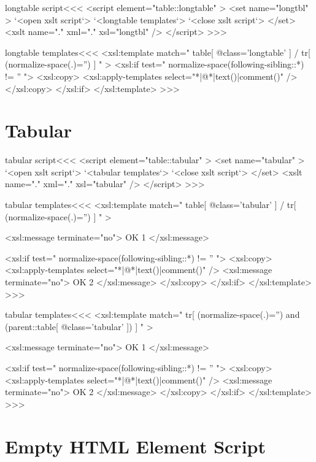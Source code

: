 \documentclass{article}
\begin{document}
{{{ 
\<longtable script\><<<
<script element="table::longtable" >
   <set name="longtbl" >
      `<open xslt script`>
      `<longtable templates`>
      `<close xslt script`>
   </set>
   <xslt name="." xml="." xsl="longtbl" />
</script> 
>>>


\<longtable templates\><<<
<xsl:template match=" table[ @class='longtable' ]
                    / tr[ (normalize-space(.)='') ] " >
   <xsl:if test=" normalize-space(following-sibling::*) != '' ">
      <xsl:copy>
         <xsl:apply-templates select="*|@*|text()|comment()" />
      </xsl:copy>      
   </xsl:if>
</xsl:template> 
>>>




\section{Tabular}


 
\<tabular script\><<<
<script element="table::tabular" >
   <set name="tabular" >
      `<open xslt script`>
      `<tabular templates`>
      `<close xslt script`>
   </set>
   <xslt name="." xml="." xsl="tabular" />
</script> 
>>>


\<tabular templates\><<<
<xsl:template match=" table[ @class='tabular' ]
                    / tr[ (normalize-space(.)='') ] " >

<xsl:message terminate="no">
OK 1
</xsl:message>

   <xsl:if test=" normalize-space(following-sibling::*) != '' ">
      <xsl:copy>
         <xsl:apply-templates select="*|@*|text()|comment()" />
<xsl:message terminate="no">
OK 2
</xsl:message>
      </xsl:copy>      
   </xsl:if>
</xsl:template> 
>>>





\<tabular templates\><<<
<xsl:template match=" tr[ (normalize-space(.)='') 
                          and
                          (parent::table[ @class='tabular' ])
                        ] " >

<xsl:message terminate="no">
OK 1
</xsl:message>

   <xsl:if test=" normalize-space(following-sibling::*) != '' ">
      <xsl:copy>
         <xsl:apply-templates select="*|@*|text()|comment()" />
<xsl:message terminate="no">
OK 2
</xsl:message>
      </xsl:copy>      
   </xsl:if>
</xsl:template> 
>>>


\section{Empty HTML Element Script}

}}}
\end{document}
